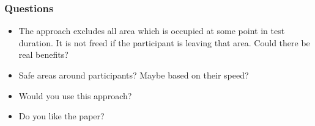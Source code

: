 \documentclass{beamer}
\begin{document}
\begin{frame}
    \frametitle{Questions}
    \begin{itemize}
        \item The approach excludes all area which is occupied at some point in test duration.
            It is not freed if the participant is leaving that area.
            Could there be real benefits?
        \item Safe areas around participants? Maybe based on their speed?
        \item Would you use this approach?
        \item Do you like the paper?
    \end{itemize}
\end{frame}
\end{document}
